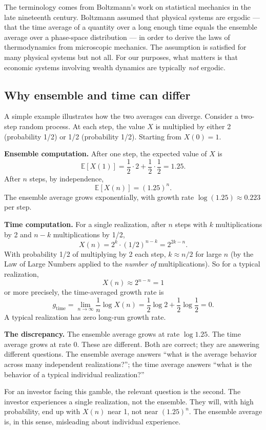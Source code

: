 The terminology comes from Boltzmann's work on statistical mechanics
in the late nineteenth century. Boltzmann assumed that physical
systems are ergodic --- that the time average of a quantity over a
long enough time equals the ensemble average over a phase-space
distribution --- in order to derive the laws of thermodynamics from
microscopic mechanics. The assumption is satisfied for many physical
systems but not all. For our purposes, what matters is that economic
systems involving wealth dynamics are typically \emph{not} ergodic.

\subsection{Why ensemble and time can differ}

A simple example illustrates how the two averages can diverge.
Consider a two-step random process. At each step, the value $X$ is
multiplied by either 2 (probability 1/2) or 1/2 (probability 1/2).
Starting from $X(0) = 1$.

\textbf{Ensemble computation.} After one step, the expected value of
$X$ is
\[
    \mathbb{E}[X(1)] = \frac{1}{2} \cdot 2 + \frac{1}{2} \cdot \frac{1}{2}
    = 1.25.
\]
After $n$ steps, by independence,
\[
    \mathbb{E}[X(n)] = (1.25)^n.
\]
The ensemble average grows exponentially, with growth rate
$\log(1.25) \approx 0.223$ per step.

\textbf{Time computation.} For a single realization, after $n$
steps with $k$ multiplications by 2 and $n-k$ multiplications by 1/2,
\[
    X(n) = 2^k \cdot (1/2)^{n-k} = 2^{2k-n}.
\]
With probability 1/2 of multiplying by 2 each step, $k \approx n/2$
for large $n$ (by the Law of Large Numbers applied to the
\emph{number of} multiplications). So for a typical realization,
\[
    X(n) \approx 2^{n - n} = 1
\]
or more precisely, the time-averaged growth rate is
\[
    g_{\text{time}} = \lim_{n \to \infty} \frac{1}{n} \log X(n)
    = \frac{1}{2} \log 2 + \frac{1}{2} \log\frac{1}{2} = 0.
\]
A typical realization has zero long-run growth rate.

\textbf{The discrepancy.} The ensemble average grows at rate $\log
1.25$. The time average grows at rate 0. These are different. Both
are correct; they are answering different questions. The ensemble
average answers ``what is the average behavior across many
independent realizations?''; the time average answers ``what is the
behavior of a typical individual realization?''

For an investor facing this gamble, the relevant question is the
second. The investor experiences a single realization, not the
ensemble. They will, with high probability, end up with $X(n)$ near
1, not near $(1.25)^n$. The ensemble average is, in this sense,
misleading about individual experience.

